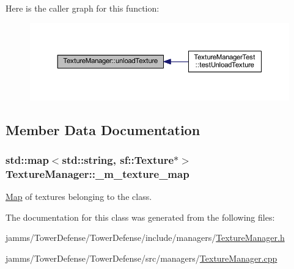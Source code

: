 Here is the caller graph for this function\+:\nopagebreak
\begin{figure}[H]
\begin{center}
\leavevmode
\includegraphics[width=350pt]{class_texture_manager_a8a77e473313f9c07df6b76eafa5b5bd2_icgraph}
\end{center}
\end{figure}




\subsection{Member Data Documentation}
\hypertarget{class_texture_manager_a78bfaa7b400c1229762b49af63913752}{
\subsubsection[{\+\_\+m\+\_\+texture\+\_\+map}]{\setlength{\rightskip}{0pt plus 5cm}std\+::map$<$std\+::string, sf\+::\+Texture$\ast$$>$ Texture\+Manager\+::\+\_\+m\+\_\+texture\+\_\+map\hspace{0.3cm}{\ttfamily [private]}}}\label{class_texture_manager_a78bfaa7b400c1229762b49af63913752}


\hyperlink{class_map}{Map} of textures belonging to the class. 



The documentation for this class was generated from the following files\+:\begin{DoxyCompactItemize}
\item 
jamms/\+Tower\+Defense/\+Tower\+Defense/include/managers/\hyperlink{_texture_manager_8h}{Texture\+Manager.\+h}\item 
jamms/\+Tower\+Defense/\+Tower\+Defense/src/managers/\hyperlink{_texture_manager_8cpp}{Texture\+Manager.\+cpp}\end{DoxyCompactItemize}
